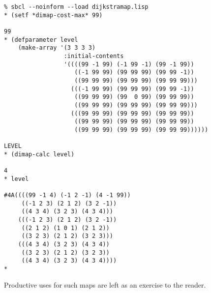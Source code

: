 \documentclass[12pt,a4paper]{article}
\begin{document}
\begin{verbatim}
% sbcl --noinform --load dijkstramap.lisp
* (setf *dimap-cost-max* 99)

99
* (defparameter level
    (make-array '(3 3 3 3)
                 :initial-contents
                 '((((99 -1 99) (-1 99 -1) (99 -1 99))
                    ((-1 99 99) (99 99 99) (99 99 -1))
                    ((99 99 99) (99 99 99) (99 99 99)))
                   (((-1 99 99) (99 99 99) (99 99 -1))
                    ((99 99 99) (99  0 99) (99 99 99))
                    ((99 99 99) (99 99 99) (99 99 99)))
                   (((99 99 99) (99 99 99) (99 99 99))
                    ((99 99 99) (99 99 99) (99 99 99))
                    ((99 99 99) (99 99 99) (99 99 99))))))

LEVEL
* (dimap-calc level)

4
* level

#4A((((99 -1 4) (-1 2 -1) (4 -1 99))
     ((-1 2 3) (2 1 2) (3 2 -1))
     ((4 3 4) (3 2 3) (4 3 4)))
    (((-1 2 3) (2 1 2) (3 2 -1))
     ((2 1 2) (1 0 1) (2 1 2))
     ((3 2 3) (2 1 2) (3 2 3)))
    (((4 3 4) (3 2 3) (4 3 4))
     ((3 2 3) (2 1 2) (3 2 3))
     ((4 3 4) (3 2 3) (4 3 4))))
*
\end{verbatim}

Productive uses for such maps are left as an exercise to the reader.

\clearpage

\end{document}
